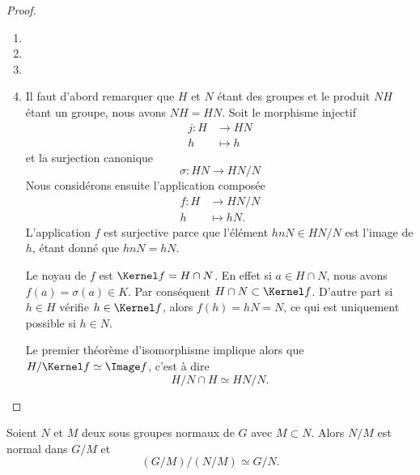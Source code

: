 \begin{proof}
    \begin{enumerate}
        \item
        \item
        \item
        \item
            Il faut d'abord remarquer que \( H\) et \( N\) étant des groupes et le produit \( NH\) étant un groupe, nous avons \( NH=HN\). Soit le morphisme injectif
            \begin{equation}
                \begin{aligned}
                    j\colon H&\to HN \\
                    h&\mapsto h
                \end{aligned}
            \end{equation}
            et la surjection canonique
            \begin{equation}
                \sigma\colon HN\to HN/N 
            \end{equation}
            Nous considérons ensuite l'application composée
            \begin{equation}
                \begin{aligned}
                    f\colon H&\to HN/N \\
                    h&\mapsto hN. 
                \end{aligned}
            \end{equation}
            L'application \( f\) est surjective parce que l'élément \( hnN\in HN/N\) est l'image de \( h\), étant donné que \( hnN=hN\).

            Le noyau de \( f\) est \( \Kernel f=H\cap N\). En effet si \( a\in H\cap N\), nous avons \( f(a)=\sigma(a)\in K\). Par conséquent \( H\cap N\subset \Kernel f\). D'autre part si \( h\in H\) vérifie \( h\in\Kernel f\), alors \( f(h)=hN=N\), ce qui est uniquement possible si \( h\in N\).

            Le premier théorème d'isomorphisme implique alors que \( H/\Kernel f\simeq \Image f\), c'est à dire
            \begin{equation}
                H/N\cap H\simeq HN/N.
            \end{equation}
    \end{enumerate}
\end{proof}

\begin{theorem}
    Soient \( N\) et \( M\) deux sous groupes normaux de \( G\) avec \( M\subset N\). Alors \( N/M\) est normal dans \( G/M\) et
    \begin{equation}
        (G/M)/(N/M)\simeq G/N.
    \end{equation}
\end{theorem}

